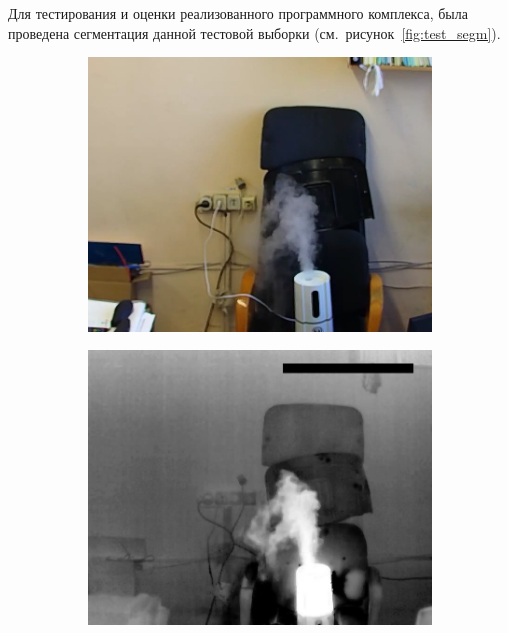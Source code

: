 \documentclass[14pt, a4paper]{extreport}
\begin{document}
	Для тестирования и оценки реализованного программного комплекса, была проведена сегментация данной тестовой выборки (см.~рисунок~\ref{fig:test_segm}).
	\vspace*{-0.1cm}
	\begin{figure}[h!]
		\begin{subfigure}{.32\textwidth}
			\centering
			\includegraphics[width = \textwidth]{image/chapter_3/examples/img/206}
		\end{subfigure}
		\begin{subfigure}{.32\textwidth}
			\centering
			\includegraphics[width = \textwidth]{image/chapter_3/examples/tep/206}

\end{subfigure}
\end{figure}
\end{document}
